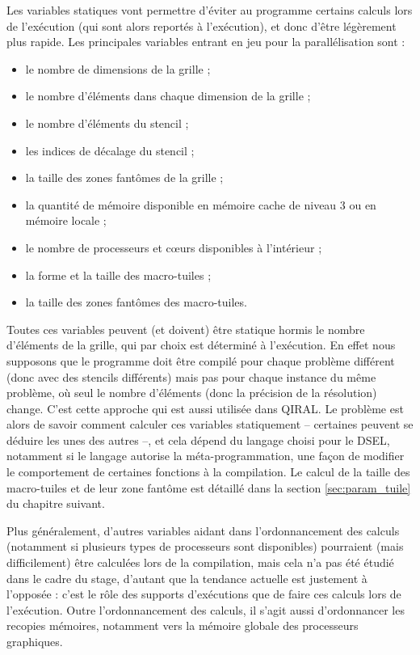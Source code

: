 Les variables statiques vont permettre d'éviter au programme certains calculs lors de l'exécution (qui sont alors reportés à l'exécution), et donc d'être légèrement plus rapide. Les principales variables entrant en jeu pour la parallélisation sont :
\begin{itemize}
\item le nombre de dimensions de la grille ;
\item le nombre d'éléments dans chaque dimension de la grille ;
\item le nombre d'éléments du stencil ;
\item les indices de décalage du stencil ;
\item la taille des zones fantômes de la grille ;
\item la quantité de mémoire disponible en mémoire cache de niveau 3 ou en mémoire locale ;
\item le nombre de processeurs et cœurs disponibles à l'intérieur ;
\item la forme et la taille des macro-tuiles ;
\item la taille des zones fantômes des macro-tuiles.
\end{itemize}

Toutes ces variables peuvent (et doivent) être statique hormis le nombre d'éléments de la grille, qui par choix est déterminé à l'exécution. En effet nous supposons que le programme doit être compilé pour chaque problème différent (donc avec des stencils différents) mais pas pour chaque instance du même problème, où seul le nombre d'éléments (donc la précision de la résolution) change. C'est cette approche qui est aussi utilisée dans \textsf{QIRAL}. Le problème est alors de savoir comment calculer ces variables statiquement -- certaines peuvent se déduire les unes des autres --, et cela dépend du langage choisi pour le DSEL, notamment si le langage autorise la méta-programmation, une façon de modifier le comportement de certaines fonctions à la compilation. Le calcul de la taille des macro-tuiles et de leur zone fantôme est détaillé dans la section \ref{sec:param_tuile} du chapitre suivant.

Plus généralement, d'autres variables aidant dans l'ordonnancement des calculs (notamment si plusieurs types de processeurs sont disponibles) pourraient (mais difficilement) être calculées lors de la compilation, mais cela n'a pas été étudié dans le cadre du stage, d'autant que la tendance actuelle est justement à l'opposée : c'est le rôle des supports d'exécutions que de faire ces calculs lors de l'exécution. Outre l'ordonnancement des calculs, il s'agit aussi d'ordonnancer les recopies mémoires, notamment vers la mémoire globale des processeurs graphiques.

